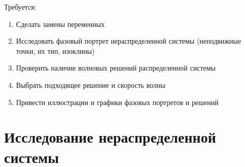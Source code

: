 \documentclass[oneside, final, 12pt]{article}
\begin{document}
Требуется:
\begin{enumerate}
    \item Сделать замены переменных
    \item Исследовать фазовый портрет нераспределенной системы (неподвижные точки, их тип, изоклины)
    \item Проверить наличие волновых решений распределенной системы
    \item Выбрать подходящее решение и скорость волны
    \item Привести иллюстрации и графики фазовых портретов и решений
\end{enumerate}

\newpage
\section{Исследование нераспределенной системы}						%
\end{document}
